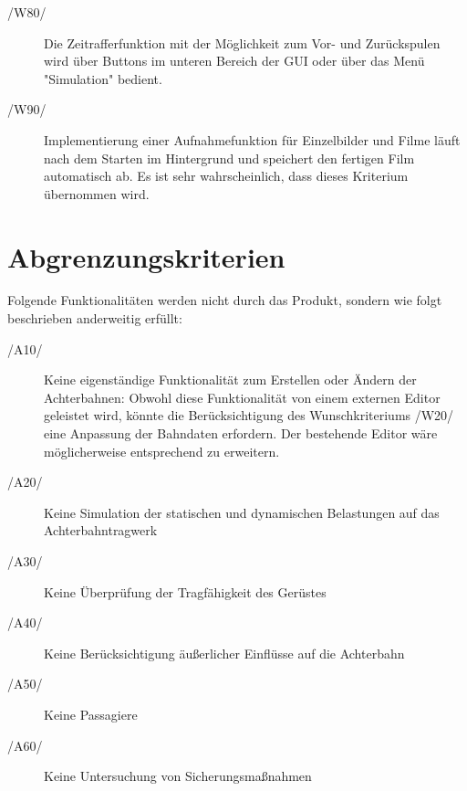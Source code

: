 \begin{description}
	\item[/W80/] Die Zeitrafferfunktion mit der Möglichkeit zum Vor- und Zurückspulen wird über Buttons im unteren Bereich der GUI oder über das Menü "Simulation" bedient.
	\item[/W90/] Implementierung einer Aufnahmefunktion für Einzelbilder und Filme läuft nach dem Starten im Hintergrund und speichert den fertigen Film automatisch ab. Es ist sehr wahrscheinlich, dass dieses Kriterium übernommen wird.
\end{description}

\section{Abgrenzungskriterien}
Folgende Funktionalitäten werden nicht durch das Produkt, sondern wie folgt
beschrieben anderweitig erfüllt:
\begin{description}
	\item[/A10/] Keine eigenständige Funktionalität zum Erstellen oder Ändern der Achterbahnen: Obwohl diese Funktionalität von einem externen Editor geleistet wird, könnte die Berücksichtigung
		     des Wunschkriteriums /W20/ eine Anpassung der Bahndaten erfordern. Der bestehende Editor wäre möglicherweise entsprechend zu erweitern.
	\item[/A20/] Keine Simulation der statischen und dynamischen Belastungen auf das Achterbahntragwerk
	\item[/A30/] Keine Überprüfung der Tragfähigkeit des Gerüstes
	\item[/A40/] Keine Berücksichtigung äußerlicher Einflüsse auf die Achterbahn
	\item[/A50/] Keine Passagiere
	\item[/A60/] Keine Untersuchung von Sicherungsmaßnahmen
\end{description}
